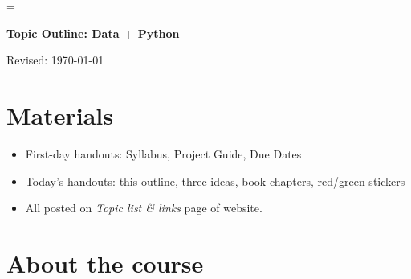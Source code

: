 \documentclass[11pt]{article}
\begin{document}
\parskip=\bigskipamount
\parindent=0.0in
\thispagestyle{empty}


\bigskip\bigskip
\centerline{\Large \bf Topic Outline:  Data + Python}
\centerline{Revised: \today}


\section*{Materials}

\begin{itemize}
\item  First-day handouts:  Syllabus, Project Guide, Due Dates
\item  Today's handouts:  this outline, three ideas, book chapters, red/green stickers
\item  All posted on {\it Topic list \& links\/} page of website.
\end{itemize}



\section*{About the course}
\end{document}
